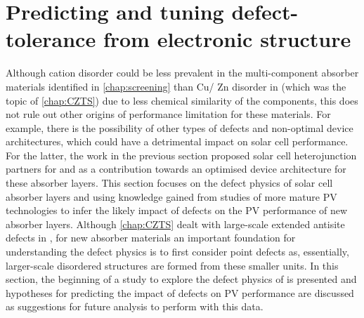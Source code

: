 \documentclass[11pt, twoside]{report}
\begin{document}







\section{Predicting and tuning defect-tolerance from electronic structure}\label{sulfosalt_defects}

Although cation disorder could be less prevalent in the multi-component absorber materials identified in \autoref{chap:screening} than Cu/ Zn disorder in {\CZTS} (which was the topic of \autoref{chap:CZTS}) due to less chemical similarity of the components, this does not rule out other origins of performance limitation for these materials. For example, there is the possibility of other types of defects and non-optimal device architectures, which could have a detrimental impact on solar cell performance. For the latter, the work in the previous section proposed solar cell heterojunction partners for {\enargite} and {\bournonite} as a contribution towards an optimised device architecture for these absorber layers. This section focuses on the defect physics of solar cell absorber layers and using knowledge gained from studies of more mature PV technologies to infer the likely impact of defects on the PV performance of new absorber layers. Although \autoref{chap:CZTS} dealt with large-scale extended antisite defects in {\CZTS}, for new absorber materials an important foundation for understanding the defect physics is to first consider point defects as, essentially, larger-scale disordered structures are formed from these smaller units. In this section, the beginning of a study to explore the defect physics of {\enargite} is presented and hypotheses for predicting the impact of defects on PV performance are discussed as suggestions for future analysis to perform with this data.
\end{document}
